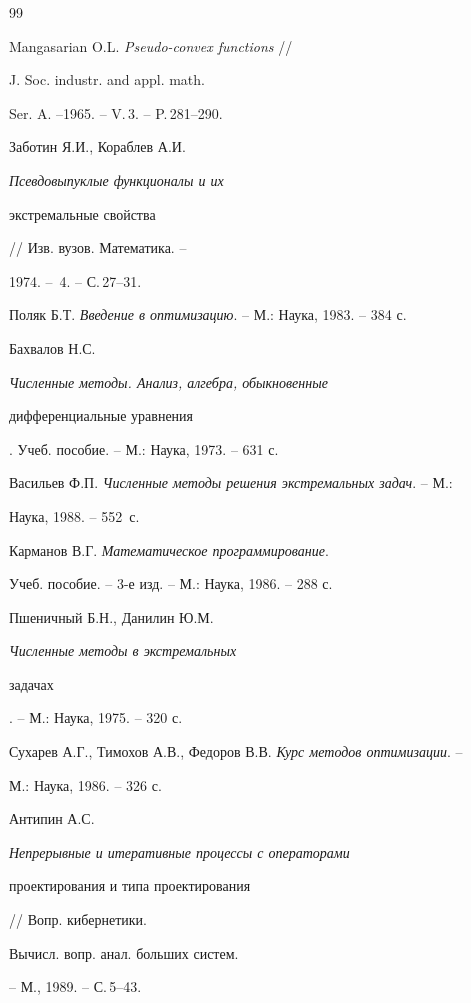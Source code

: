 \begin{thebibliography}{99}







Mangasarian O.L. {\em Pseudo-convex functions} //


J. Soc. industr. and appl. math. 


Ser. A. --1965. -- V.\,3. -- P.\,281--290.




Заботин Я.И., Кораблев А.И. {\em Псевдовыпуклые функционалы и их 


экстремальные свойства} // Изв. вузов. Математика. --


1974. -- \No\,4. -- С.\,27--31.




Поляк Б.Т. {\em Введение в оптимизацию}. -- М.: Наука, 1983. -- 384 с.




Бахвалов Н.С. {\em Численные методы. Анализ, алгебра, обыкновенные


дифференциальные уравнения}. Учеб. пособие. -- М.: Наука, 1973. -- 631 с.




Васильев Ф.П. {\em Численные методы решения экстремальных задач}. -- М.: 


Наука, 1988. -- 552~с.




Карманов В.Г. {\em Математическое программирование}.


Учеб. пособие. -- 3-е изд. -- М.: Наука, 1986. -- 288 с.




Пшеничный Б.Н., Данилин Ю.М. {\em Численные методы в экстремальных


задачах}. -- М.: Наука, 1975. -- 320 с.




Сухарев А.Г., Тимохов А.В., Федоров В.В. {\em Курс методов оптимизации}. -- 


М.: Наука, 1986. -- 326 с.




Антипин А.С. {\em Непрерывные и итеративные процессы с операторами 


проектирования и типа проектирования} // Вопр. кибернетики.


Вычисл. вопр. анал. больших систем.


-- М., 1989. -- С.\,5--43.



\end{thebibliography}
